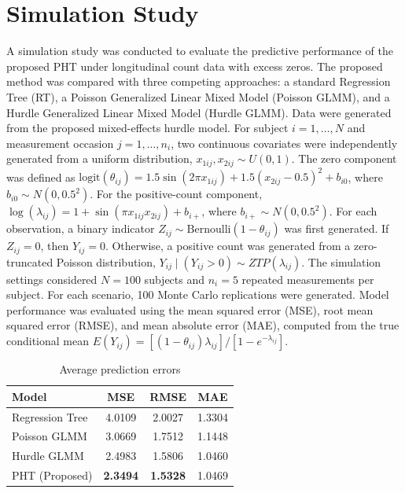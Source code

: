\documentclass[twoside]{article}
\begin{document}
\section{Simulation Study}

A simulation study was conducted to evaluate the predictive performance of the proposed PHT under longitudinal count data with excess zeros. The proposed method was compared with three competing approaches: a standard Regression Tree (RT), a Poisson Generalized Linear Mixed Model (Poisson GLMM), and a Hurdle Generalized Linear Mixed Model (Hurdle GLMM). Data were generated from the proposed mixed-effects hurdle model. For subject $i=1,\ldots,N$ and measurement occasion $j=1,\ldots,n_i$, two continuous covariates were independently generated from a uniform distribution,
$
x_{1ij},x_{2ij}\sim U(0,1)
$.
The zero component was defined as
$
	\text{logit}(\theta_{ij}) =
	1.5\sin(2\pi x_{1ij})
	+
	1.5(x_{2ij}-0.5)^2
	+
	b_{i0}
$,
where
$
b_{i0}\sim N(0,0.5^2)
$.
For the positive-count component,
$
	\log(\lambda_{ij}) =
	1
	+
	\sin(\pi x_{1ij}x_{2ij})
	+
	b_{i+}
$,
where
$
b_{i+}\sim N(0,0.5^2)
$. For each observation, a binary indicator
$
Z_{ij}\sim \mathrm{Bernoulli}(1-\theta_{ij})
$
was first generated. If $Z_{ij}=0$, then $Y_{ij}=0$. Otherwise, a positive count was generated from a zero-truncated Poisson distribution,
$
Y_{ij}\mid(Y_{ij}>0)\sim ZTP(\lambda_{ij})
$. The simulation settings considered $N=100$ subjects and $n_i=5$ repeated measurements per subject. For each scenario, 100 Monte Carlo replications were generated. Model performance was evaluated using the mean squared error (MSE), root mean squared error (RMSE), and mean absolute error (MAE), computed from the true conditional mean
$
E(Y_{ij})
=
\left[(1-\theta_{ij})\lambda_{ij}\right]/
\left[1-e^{-\lambda_{ij}}\right]
$.
\begin{table}[h]
	\begin{center}
		\small
		\caption{Average prediction errors}
		\label{tab:simresults}
		\begin{tabular}{lccc}
			\hline
			Model & MSE & RMSE & MAE \\
			\hline
			Regression Tree & 4.0109 & 2.0027 & 1.3304 \\
			Poisson GLMM    & 3.0669 & 1.7512 & 1.1448 \\
			Hurdle GLMM     & 2.4983 & 1.5806 & 1.0460 \\
			PHT (Proposed)  & \textbf{2.3494} & \textbf{1.5328} & 1.0469 \\
			\hline
		\end{tabular}
	\end{center}
\end{table}
\end{document}
